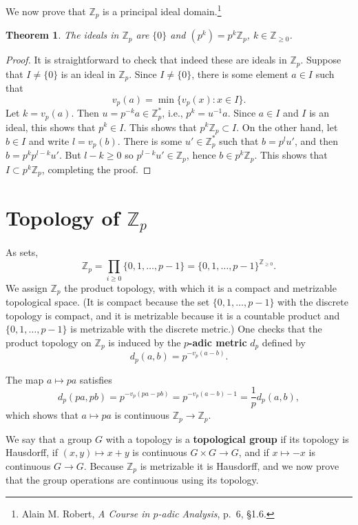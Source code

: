 \documentclass{article}
\newtheorem{theorem}{Theorem}
\theoremstyle{definition}
\begin{document}
We now prove that $\mathbb{Z}_p$ is a principal ideal domain.\footnote{Alain M. Robert, {\em A Course in $p$-adic Analysis},
p.~6, \S 1.6.}

\begin{theorem}
The ideals in $\mathbb{Z}_p$ are $\{0\}$ and $(p^k)=p^k\mathbb{Z}_p$, $k \in \mathbb{Z}_{\geq 0}$. 
\end{theorem}
\begin{proof}
It is straightforward to check that indeed these are ideals in $\mathbb{Z}_p$. Suppose that $I\neq \{0\}$ is an ideal
in
$\mathbb{Z}_p$. Since $I \neq \{0\}$, there is some element $a \in I$ such that
\[
v_p(a) = \min\{v_p(x): x \in I\}.
\]
Let $k=v_p(a)$. Then $u=p^{-k} a \in \mathbb{Z}_p^*$, i.e.,
$p^k=u^{-1} a$.
Since $a \in I$ and $I$ is an ideal, this shows that $p^k \in I$. This shows that
$p^k \mathbb{Z}_p \subset I$.
On the other hand, let $b \in I$ and write
$l=v_p(b)$. There is some $u' \in \mathbb{Z}_p^*$ such that $b=p^l u'$, and then
$b= p^k p^{l-k} u'$. But $l-k \geq 0$ so $p^{l-k} u' \in \mathbb{Z}_p$, hence $b \in p^k \mathbb{Z}_p$. 
This shows that $I \subset p^k \mathbb{Z}_p$, completing the proof.
\end{proof}



\section{Topology of $\mathbb{Z}_p$}
As sets,
\[
\mathbb{Z}_p = \prod_{i \geq 0} \{0,1,\ldots,p-1\} = \{0,1,\ldots,p-1\}^{\mathbb{Z}_{\geq 0}}.
\]
We assign $\mathbb{Z}_p$ the product topology, with which it is a compact and metrizable topological space.
(It is compact because the set $\{0,1,\ldots,p-1\}$ with the discrete topology is compact, and it is metrizable
because it is a countable product and $\{0,1,\ldots,p-1\}$ is metrizable with the discrete metric.)
One checks that the product topology on $\mathbb{Z}_p$ is induced by the \textbf{$p$-adic metric}
$d_p$ defined by 
\[
d_p(a,b) = p^{-v_p(a-b)}.
\]

The map $a \mapsto pa$ satisfies
\[
d_p(pa,pb) = p^{-v_p(pa-pb)} = p^{-v_p(a-b)-1} = \frac{1}{p}d_p(a,b),
\]
which shows that $a \mapsto pa$ is continuous $\mathbb{Z}_p \to \mathbb{Z}_p$. 

We say that a group $G$ with a topology is a \textbf{topological group} if its topology is Hausdorff, if $(x,y) \mapsto x+y$ is continuous $G \times G \to G$, and if
$x \mapsto -x$ is continuous $G \to G$. Because $\mathbb{Z}_p$ is metrizable it is Hausdorff, and we now prove that the group operations are continuous using its
topology.
\end{document}
